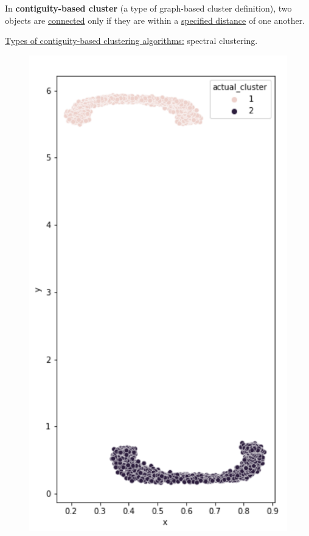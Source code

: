 \documentclass[11pt]{elegantbook}
\begin{document}
\begin{definition}
    In \textbf{contiguity-based cluster} (a type of graph-based
    cluster definition),  two objects are \underline{connected} only if they are within a \underline{specified distance} of one another.
\end{definition}
\underline{Types of contiguity-based clustering algorithms:} spectral clustering.
\begin{center}\begin{figure}[htbp]
    \centering
    \includegraphics[scale=0.25]{well-separated.png}

\end{figure}
\end{center}
\end{document}
